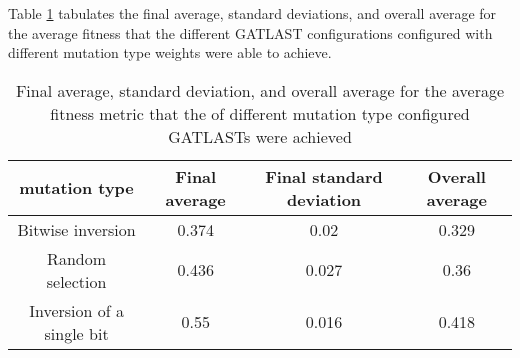 Table \ref{tab:HP:GA:mutationType:average fitness} tabulates the final average, standard deviations, and overall average for the average fitness that the different GATLAST configurations configured with different mutation type weights were able to achieve.
\begin{table}[tbh!]
\centering
\begin{adjustbox}{trim=0cm 0cm 0cm 0cm, clip=true}
\begin{tabular}{|c|c|c|c|}
\hline
mutation type & Final average & Final standard deviation & Overall average\\
\hline
Bitwise inversion & 0.374 & 0.02 & 0.329\\\hline
Random selection & 0.436 & 0.027 & 0.36\\\hline
Inversion of a single bit & 0.55 & 0.016 & 0.418\\\hline
\end{tabular}
\end{adjustbox}
\caption{Final average, standard deviation, and overall average for the average fitness metric that the of different mutation type configured GATLASTs were achieved}
\label{tab:HP:GA:mutationType:average fitness}
\end{table}